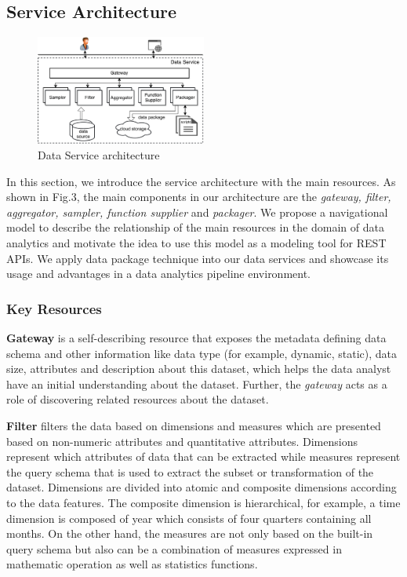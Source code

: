 \documentclass[10pt, conference, compsocconf]{IEEEtran}
\begin{document}
\subsection{Service Architecture}
\begin{figure}[th]
	\centering
	\includegraphics[width=0.5\textwidth]{serviceArchitecture.pdf}
	\caption{Data Service architecture}
	\label{fig.3}
\end{figure}
In this section, we introduce the service architecture with the main resources. As shown in Fig.3, the main components in our architecture are the \textit{gateway, filter, aggregator, sampler, function supplier} and \textit{packager}. We propose a navigational model to describe the relationship of the main resources in the domain of data analytics and motivate the idea to use this model as a modeling tool for REST APIs. We apply data package technique into our data services and showcase its usage and advantages in a data analytics pipeline environment. 

    \subsubsection{Key Resources}

\textbf{Gateway} is a self-describing resource that exposes the metadata defining data schema and other information like data type (for example, dynamic, static), data size, attributes and description about this dataset, which helps the data analyst have an initial understanding about the dataset. Further, the \textit{gateway} acts as a role of discovering related resources about the dataset. 

\textbf{Filter} filters the data based on dimensions and measures which are presented based on non-numeric attributes and quantitative attributes. Dimensions represent which attributes of data that can be extracted while measures represent the query schema that is used to extract the subset or transformation of the dataset. Dimensions are divided into atomic and composite dimensions according to the data features. The composite dimension is hierarchical, for example, a time dimension is composed of year which consists of four quarters containing all months. On the other hand, the measures are not only based on the built-in query schema but also can be a combination of measures expressed in mathematic operation as well as statistics functions.
\end{document}
